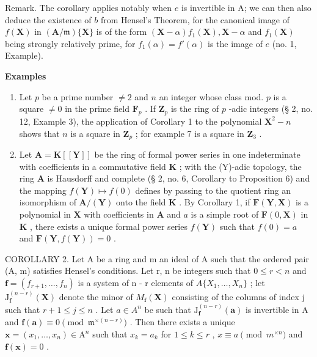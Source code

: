 Remark. The corollary applies notably when \(e\) is invertible in A; we can then also deduce the existence of \(b\) from Hensel's Theorem, for the canonical image of \(f(\mathbf{X})\) in \((\mathbf{A} / \mathfrak{m})\{\mathbf{X}\}\) is of the form \((\mathbf{X} - \alpha)f_1(\mathbf{X}), \mathbf{X} - \alpha\) and \(f_1(\mathbf{X})\) being strongly relatively prime, for \(f_1(\alpha) = f'(\alpha)\) is the image of \(e\) (no. 1, Example).

\textbf{Examples}\par

\begin{enumerate}
\def\labelenumi{(\arabic{enumi})}
\item
  Let \(p\) be a prime number \(\neq 2\) and \(n\) an integer whose class mod. \(p\) is a square \(\neq 0\) in the prime field \(\mathbf{F}_p\) . If \(\mathbf{Z}_p\) is the ring of \(p\) -adic integers (§ 2, no. 12, Example 3), the application of Corollary 1 to the polynomial \(\mathbf{X}^2 - n\) shows that \(n\) is a square in \(\mathbf{Z}_p\) ; for example 7 is a square in \(\mathbf{Z}_3\) .
\item
  Let \(\mathbf{A} = \mathbf{K}[[\mathbf{Y}]]\) be the ring of formal power series in one indeterminate with coefficients in a commutative field \(\mathbf{K}\) ; with the (Y)-adic topology, the ring \(\mathbf{A}\) is Hausdorff and complete (§ 2, no. 6, Corollary to Proposition 6) and the mapping \(f(\mathbf{Y}) \mapsto f(0)\) defines by passing to the quotient ring an isomorphism of \(\mathbf{A}/(\mathbf{Y})\) onto the field \(\mathbf{K}\) . By Corollary 1, if \(\mathbf{F}(\mathbf{Y}, \mathbf{X})\) is a polynomial in \(\mathbf{X}\) with coefficients in \(\mathbf{A}\) and \(a\) is a simple root of \(\mathbf{F}(0, \mathbf{X})\) in \(\mathbf{K}\) , there exists a unique formal power series \(f(\mathbf{Y})\) such that \(f(0) = a\) and \(\mathbf{F}(\mathbf{Y}, f(\mathbf{Y})) = 0\) .
\end{enumerate}

COROLLARY 2. Let A be a ring and m an ideal of A such that the ordered pair (A, m) satisfies Hensel's conditions. Let r, n be integers such that \(0 \leqslant r < n\) and \(\mathbf{f} = (f_{r+1}, \ldots, f_n)\) is a system of n - r elements of \(A\{X_1, \ldots, X_n\}\) ; let \(\mathrm{J}_{\mathbf{f}}^{(n-r)}(\mathbf{X})\) denote the minor of \(M_{\mathbf{f}}(\mathbf{X})\) consisting of the columns of index j such that \(r + 1 \leqslant j \leqslant n\) . Let \(a \in A^n\) be such that \(\mathrm{J}_{\mathbf{f}}^{(n-r)}(\mathbf{a})\) is invertible in A and \(\mathbf{f}(\mathbf{a}) \equiv 0 \pmod{\mathfrak{m}^{\times(n-r)}}\) . Then there exists a unique \(\mathbf{x} = (x_1, \ldots, x_n) \in \mathrm{A}^n\) such that \(x_k = a_k\) for \(1 \leqslant k \leqslant r\) , \(x \equiv a \pmod{m^{\times n}}\) and \(\mathbf{f}(\mathbf{x}) = 0\) .

